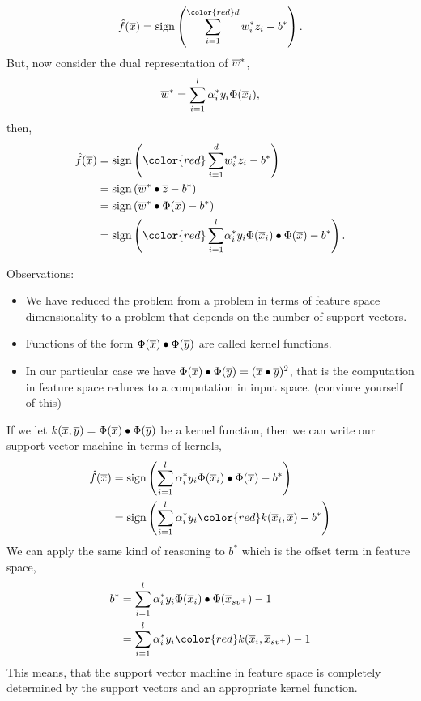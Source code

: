 \documentclass[a4paper,blends,pdf,colorBG,slideColor]{prosper}
\begin{document}
\begin{equation*}
\model{f}(\ol{x}) =  \sign\left (\sum_{i=1}^{\color{red}d} w^*_i z_i - b^*\right ).
\end{equation*}
But, now consider the dual representation of $\overline{w}^*$,
\begin{equation*}
\overline{w}^* = \sum_{i=1}^l \alpha^*_i y_i  \Phi(\overline{x}_i),
\end{equation*}
then,
\begin{align*}
\model{f}(\ol{x}) &=  \sign\left ({\color{red}\sum_{i=1}^d} w^*_i z_i - b^*\right )\\
&=  \sign\left (\ol{w}^*\bullet \ol{z} - b^*\right )\\
&=  \sign\left (\ol{w}^*\bullet\Phi(\ol{x})  - b^*\right )\\
&=  \sign\left ({\color{red}\sum_{i=1}^l} \alpha^*_i y_i  \Phi(\ol{x}_i)\bullet\Phi(\ol{x})  - b^*\right ).
\end{align*}

\es

Observations:

\begin{itemize}
\item We have reduced the problem from a problem in terms of feature space dimensionality
to a problem that depends on the number of support vectors.

\item Functions of the form $\Phi(\overline{x})\bullet\Phi(\overline{y}) $ are called kernel functions.

\item In our particular case we have $\Phi(\overline{x})\bullet\Phi(\overline{y}) = (\overline{x}\bullet\overline{y})^2$, that is
the computation in feature space reduces to a computation in input space.  (convince yourself of this)

\end{itemize}
\es

\small
If we let $k(\overline{x},\overline{y}) =\Phi(\overline{x})\bullet\Phi(\overline{y}) $ be a kernel function, then we can write
our support vector machine in terms of kernels,
\begin{align*}
\model{f}(\ol{x}) &=  \sign\left (\sum_{i=1}^l \alpha^*_i y_i  \Phi(\ol{x}_i)\bullet\Phi(\ol{x})  - b^*\right )\\
	&=  \sign\left (\sum_{i=1}^l \alpha^*_i y_i  {\color{red}k(\ol{x}_i,\ol{x})}  - b^*\right )
\end{align*}
We can apply the same kind of reasoning to $b^*$ which is the offset term in feature space,
\begin{align*}
b^* & = \sum_{i=1}^l \alpha^*_i y_i  \Phi(\ol{x}_i)\bullet\Phi(\ol{x}_{sv^+}) - 1\\
	& = \sum_{i=1}^l \alpha^*_i y_i  {\color{red}k(\ol{x}_i,\ol{x}_{sv^+})} - 1
\end{align*}
This means, that the support vector machine in feature space is completely determined by
the support vectors and an appropriate kernel function.
\end{document}
